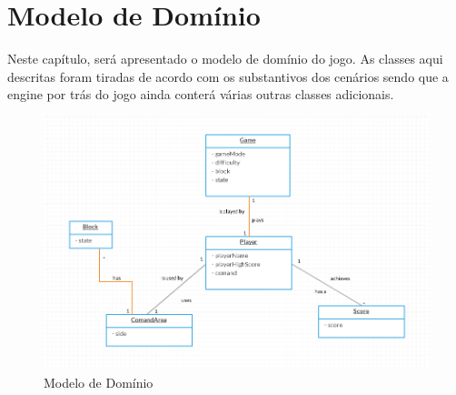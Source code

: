 \chapter[Modelo de Domínio]{Modelo de Domínio}

Neste capítulo, será apresentado o modelo de domínio do jogo. As classes aqui descritas foram tiradas de acordo com os substantivos dos cenários sendo que a engine por trás do jogo ainda conterá várias outras classes adicionais.


\begin{figure}[H]
\centering\includegraphics[scale=0.5]{figuras/modeloDominio.png}
\caption{Modelo de Domínio}
\end{figure}

